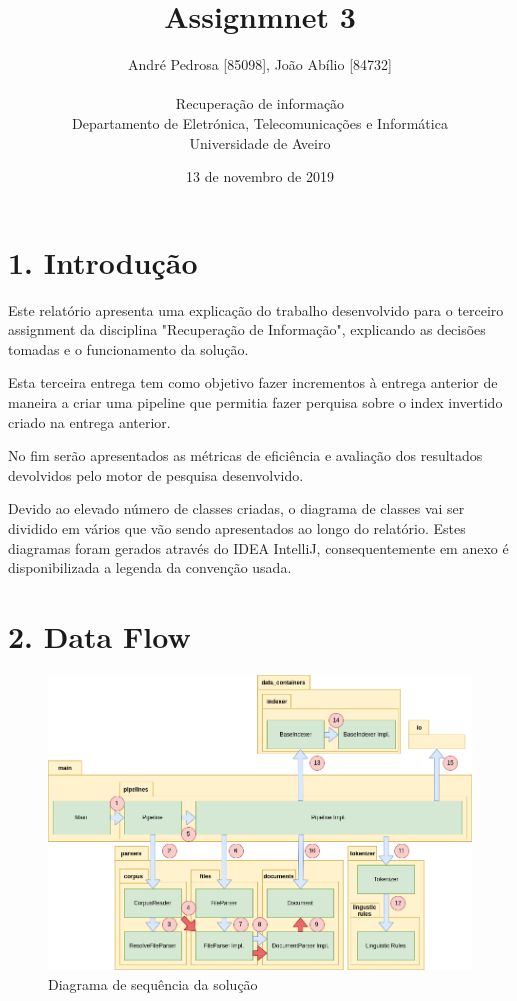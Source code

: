 \documentclass[12pt]{article}
\title{Assignmnet 3}
\author{
    André Pedrosa [85098], João Abílio [84732]\\
    \\
    Recuperação de informação\\
    \normalsize{Departamento de Eletrónica, Telecomunicações e Informática}\\
    \normalsize{Universidade de Aveiro}\\
}
\date{13 de novembro de 2019}
\begin{document}
\baselineskip18pt

\maketitle

\section*{1. Introdução}
Este relatório apresenta uma explicação do trabalho desenvolvido
para o terceiro assignment da disciplina "Recuperação de Informação",
explicando as decisões tomadas e o funcionamento da solução.

Esta terceira entrega tem como objetivo fazer incrementos à entrega
anterior de maneira a criar uma pipeline que permitia fazer
perquisa sobre o index invertido criado na entrega anterior.

No fim serão apresentados as métricas de eficiência e avaliação dos
resultados devolvidos pelo motor de pesquisa desenvolvido.

Devido ao elevado número de classes criadas, o diagrama de classes
vai ser dividido em vários que vão sendo apresentados ao longo do
relatório. Estes diagramas foram gerados através do IDEA IntelliJ,
consequentemente em anexo é disponibilizada a legenda da convenção
usada.

\section*{2. Data Flow}
\begin{figure}[h]
  \center
  \includegraphics[width=\linewidth]{newsequenceDiagram.png}
  \caption{Diagrama de sequência da solução}
  \label{fig:dataflow}
\end{figure}
\end{document}
